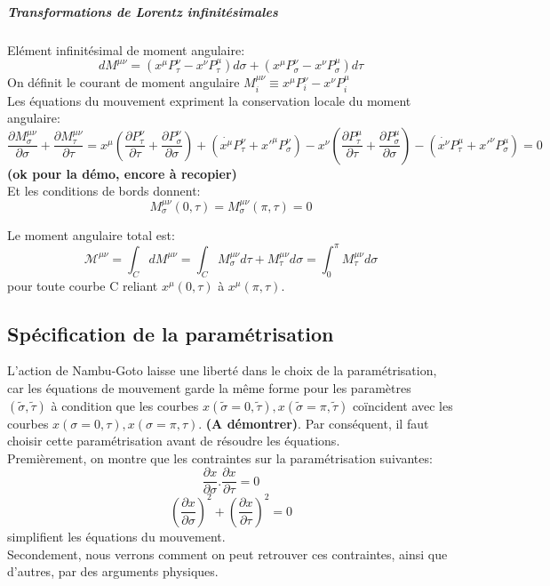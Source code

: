 \documentclass[a4paper,12pt]{article}
\begin{document}
\subparagraph{Transformations de Lorentz infinitésimales}
Elément infinitésimal de moment angulaire:
$$dM^{\mu\nu}=(x^{\mu}P^{\nu}_{\tau}-x^{\nu}P^{\mu}_{\tau})d\sigma+(x^{\mu}P^{\nu}_{\sigma}-x^{\nu}P^{\mu}_{\sigma})d\tau$$
On définit le courant de moment angulaire $M_{i}^{\mu\nu}\equiv x^{\mu}P^{\nu}_{i}-x^{\nu}P^{\mu}_{i}$\\
Les équations du mouvement expriment la conservation locale du moment angulaire:
$$\frac{\partial M_{\sigma}^{\mu\nu}}{\partial \sigma}+\frac{\partial M_{\tau}^{\mu\nu}}{\partial \tau}=x^{\mu}\left( \frac{\partial P^{\nu}_{\tau}}{\partial \tau}+\frac{\partial P^{\nu}_{\sigma}}{\partial \sigma}\right) +\left( \dot{x^{\mu}}P^{\nu}_{\tau}+x'^{\mu}P^{\nu}_{\sigma}\right) -x^{\nu}\left( \frac{\partial P^{\mu}_{\tau}}{\partial \tau}+\frac{\partial P^{\mu}_{\sigma}}{\partial \sigma}\right) -\left( \dot{x^{\nu}}P^{\mu}_{\tau}+x'^{\nu}P^{\mu}_{\sigma}\right)=0$$
\textbf{(ok pour la démo, encore à recopier)}\\
Et les conditions de bords donnent:
$$M_{\sigma}^{\mu\nu}(0,\tau)=M_{\sigma}^{\mu\nu}(\pi,\tau)=0$$

Le moment angulaire total est: 
$$\mathcal{M^{\mu\nu}}=\int_{C}dM^{\mu\nu}=\int_{C}M^{\mu\nu}_{\sigma}d\tau+M^{\mu\nu}_{\tau}d\sigma=\int_{0}^{\pi}M^{\mu\nu}_{\tau}d\sigma$$
pour toute courbe C reliant $x^{\mu}(0,\tau)$ à $x^{\mu}(\pi,\tau)$.
\subsection{Spécification de la paramétrisation}
L'action de Nambu-Goto laisse une liberté dans le choix de la paramétrisation, car les équations de mouvement garde la même forme pour les paramètres $(\tilde{\sigma},\tilde{\tau})$ à condition que les courbes $x(\tilde{\sigma}=0,\tilde{\tau}), x(\tilde{\sigma}=\pi,\tilde{\tau})$ coïncident avec les courbes $x(\sigma=0,\tau), x(\sigma=\pi,\tau)$. \textbf{(A démontrer)}.
Par conséquent, il faut choisir cette paramétrisation avant de résoudre les équations.\\
Premièrement, on montre que les contraintes sur la paramétrisation suivantes:
\begin{equation}
\frac{\partial x}{\partial \sigma}.\frac{\partial x}{\partial \tau}=0
\end{equation}
\begin{equation}
\left( \frac{\partial x}{\partial \sigma}\right) ^{2}+\left(\frac{\partial x}{\partial \tau}\right) ^{2}=0 
\end{equation}
simplifient les équations du mouvement.\\ Secondement, nous verrons comment on peut retrouver ces contraintes, ainsi que d'autres, par des arguments physiques. 
\end{document}
